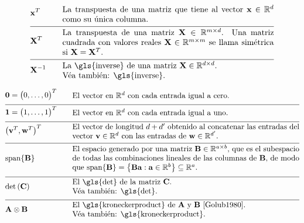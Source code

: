 \begin{align}
	&\featurevec^{T} &\quad & \parbox{.75\textwidth}{La transpuesta de una matriz que tiene al vector 
		$\featurevec \in \mathbb{R}^{\dimlocalmodel}$ como su única columna.} \nonumber \\[2mm] \hline \nonumber\\[-5mm]
	&\mathbf{X}^{T} &\quad & \parbox{.75\textwidth}{La transpuesta de una matriz $\mathbf{X} \in \mathbb{R}^{\samplesize \times \featurelen}$. 
		Una matriz cuadrada con valores reales $\mathbf{X} \in \mathbb{R}^{\samplesize \times \samplesize}$ 
		se llama simétrica si $\mathbf{X} = \mathbf{X}^{T}$.} \nonumber \\[2mm] \hline \nonumber\\[-5mm]
	&\mathbf{X}^{-1} &\quad & \parbox{.75\textwidth}{La \gls{inverse} de una matriz $\mathbf{X} \in \mathbb{R}^{\featurelen \times \featurelen}$.
		\\ Véa también: \gls{inverse}.} \nonumber 
\end{align} 

\begin{align} 
	&\mathbf{0}= \big(0, \ldots, 0\big)^{T}  & \quad &  \parbox{.75\textwidth}{El vector en $\mathbb{R}^{\dimlocalmodel}$ con cada entrada igual a cero.} \nonumber \\[2mm] \hline \nonumber\\[-5mm]
	&\mathbf{1}= \big(1, \ldots, 1\big)^{T}  & \quad &  \parbox{.75\textwidth}{El vector en $\mathbb{R}^{\dimlocalmodel}$ con cada entrada igual a uno.} \nonumber \\[2mm] \hline \nonumber\\[-5mm]
	&\big(\vv^{T},\vw^{T} \big)^{T}  & \quad &  \parbox{.85\textwidth}{El vector de longitud $\featurelen+\featurelen'$ 
		obtenido al concatenar las entradas del vector $\vv \in \mathbb{R}^{\featurelen}$ con las entradas de $\vw \in \mathbb{R}^{\featurelen'}$.} \nonumber \\[2mm] \hline \nonumber\\[-5mm]
	&{\rm span}\{ \mathbf{B} \}  & \quad &  \parbox{.85\textwidth}{El espacio generado por una matriz $\mathbf{B} \in \mathbb{R}^{a \times b}$, 
		que es el subespacio de todas las combinaciones lineales de las columnas de $\mathbf{B}$, de modo que
		${\rm span}\{ \mathbf{B} \} = \big\{ \mathbf{B} \va : \va \in \mathbb{R}^{b} \big\} \subseteq \mathbb{R}^{a}$.} \nonumber \\[2mm] \hline \nonumber\\[-5mm]
	&\determinant{\mC} &\quad & \parbox{.85\textwidth}{El \gls{det} de la matriz $\mC$.
		\\ Véa también: \gls{det}.} \nonumber \\[2mm] \hline \nonumber\\[-5mm]
	&\mathbf{A} \otimes \mathbf{B} &\quad & \parbox{.85\textwidth}{El \gls{kroneckerproduct} de $\mathbf{A}$ y $\mathbf{B}$ \cite{Golub1980}.
		\\ Véa también: \gls{kroneckerproduct}.} \nonumber
\end{align}

